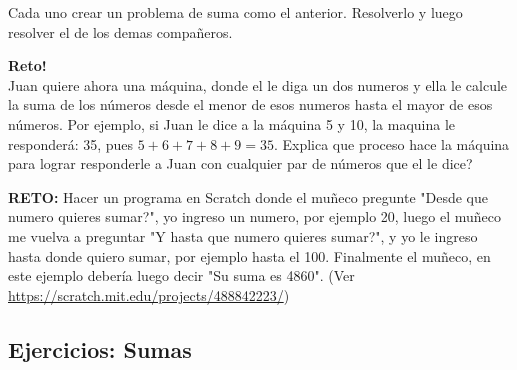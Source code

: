 \begin{exer}
	Cada uno crear un problema de suma como el anterior. Resolverlo y luego resolver el de los demas compañeros.
\end{exer}

\begin{exer}\textbf{Reto!}{\ \\}
	Juan quiere ahora una máquina, donde el le diga un dos numeros y ella le calcule la suma de los números desde el menor de esos numeros hasta el mayor de esos números. Por ejemplo, si Juan le dice a la máquina 5 y 10, la maquina le responderá: 35, pues $5+6+7+8+9=35$. Explica que proceso hace la máquina para lograr responderle a Juan con cualquier par de números que el le dice? 
\end{exer}

\begin{tcolorbox}[colback=white!5!white,colframe=green!50!black]
	\textbf{RETO:} Hacer un programa en Scratch donde el muñeco pregunte "Desde que numero quieres sumar?",  yo ingreso un numero, por ejemplo 20, luego el muñeco me vuelva a preguntar "Y hasta que numero quieres sumar?", y yo le ingreso hasta donde quiero sumar, por ejemplo hasta el 100. Finalmente el muñeco, en este ejemplo debería luego decir "Su suma es 4860". (Ver \url{https://scratch.mit.edu/projects/488842223/})
\end{tcolorbox}
\newpage
\begin{center}
	\vspace{-1cm}
	\section{Ejercicios: Sumas}\label{ejercicios_chapter_sumas}
\end{center}
